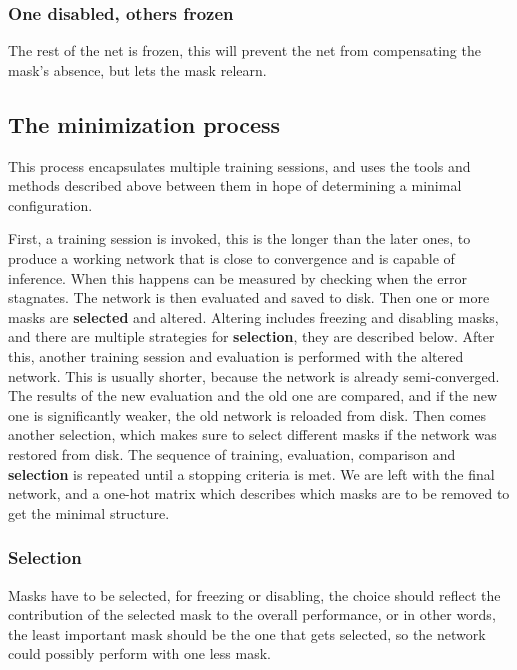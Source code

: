 \documentclass[12pt]{report}
\begin{document}
\subsubsection{One disabled, others frozen}The rest of the net is frozen, this will prevent the net from compensating the mask's absence, but lets the mask relearn.
\subsection{The minimization process}
This process encapsulates multiple training sessions, and uses the tools and methods described above between them in hope of determining a minimal configuration.\par
First, a training session is invoked, this is the longer than the later ones, to produce a working network that is close to convergence and is capable of inference. When this happens can be measured by checking when the error stagnates. The network is then evaluated and saved to disk. Then one or more masks are \textbf{selected} and altered. Altering includes freezing and disabling masks, and there are multiple strategies for \textbf{selection}, they are described below. After this, another training session and evaluation is performed with the altered network. This is usually shorter, because the network is already semi-converged. The results of the new evaluation and the old one are compared, and if the new one is significantly weaker, the old network is reloaded from disk. Then comes another selection, which makes sure to select different masks if the network was restored from disk. The sequence of training, evaluation, comparison and \textbf{selection} is repeated until a stopping criteria is met. We are left with the final network, and a one-hot matrix which describes which masks are to be removed to get the minimal structure.
\subsubsection{Selection}
Masks have to be selected, for freezing or disabling, the choice should reflect the contribution of the selected mask to the overall performance, or in other words, the least important mask should be the one that gets selected, so the network could possibly perform with one less mask.
\end{document}
